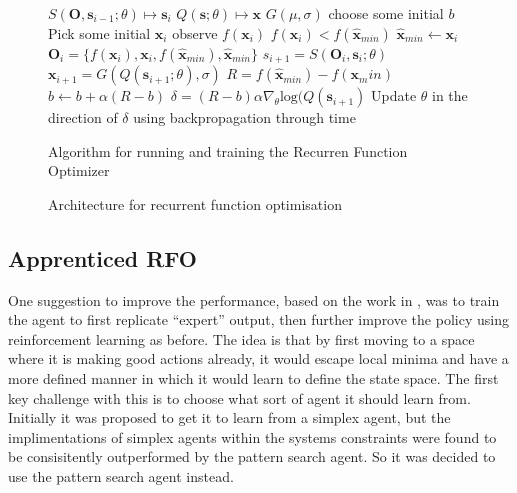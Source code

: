 \begin{figure}
\centering
\begin{minipage}{.8\textwidth}
\begin{algorithmic}
\State $S(\boldsymbol{O}, \boldsymbol{s}_{i-1}; \theta) \mapsto \boldsymbol{s}_i$
\State $Q(\boldsymbol{s} ;\theta) \mapsto \boldsymbol{x} $
\State $G(\mu,\sigma)$  
\State choose some initial $b$ 
 \Repeat
 	\State Pick some initial $\boldsymbol{x}_i$
 	\Repeat
 		\State observe $f(\boldsymbol{x}_i)$
 		\If $f(\boldsymbol{x}_i) < f(\hat{\boldsymbol{x}}_{min})$
 			\State$ \hat{\boldsymbol{x}}_{min} \gets \boldsymbol{x}_i$
 		\EndIf
 		\State $\boldsymbol{O}_i = \{f(\boldsymbol{x}_i),\boldsymbol{x}_i, f(\hat{\boldsymbol{x}}_{min}), \hat{\boldsymbol{x}}_{min}\} $
 		\State $s_{i+1} = S(\boldsymbol{O}_i, \boldsymbol{s}_{i}; \theta)$
 		\State $\boldsymbol{x}_{i+1} = G(Q(\boldsymbol{s}_{i+1};\theta),\sigma)$ 
	\State $R = f(\hat{\boldsymbol{x}}_{min}) - f(\boldsymbol{x}_min)$
	\State $b \gets b  + \alpha (R - b)$ 
	\State $\delta = (R - b) \alpha \nabla_\theta \text{log}(Q(\boldsymbol{s}_{i+1})$
	\State Update $\theta$ in the direction of $\delta$ using backpropagation through time
 \end{algorithmic}
 \end{minipage}
 \caption{Algorithm for running and training the Recurren Function Optimizer}
 \label{alg:rfo}
\end{figure}

\begin{figure}
\centering

\caption{Architecture for recurrent function optimisation}
\label{fig:RFOarch}
\end{figure}

\subsection{Apprenticed RFO}
One suggestion to improve the performance, based on the work in \cite{alphaGO}, was to train the agent to first replicate ``expert'' output, then further improve the policy using reinforcement learning as before. The idea is that by first moving to a space where it is making good actions already, it would escape local minima and have a more defined manner in which it would learn to define the state space. The first key challenge with this is to choose what sort of agent it should learn from. Initially it was proposed to get it to learn from a simplex agent, but the implimentations of simplex agents within the systems constraints were found to be consisitently outperformed by the pattern search agent. So it was decided to use the pattern search agent instead. 

